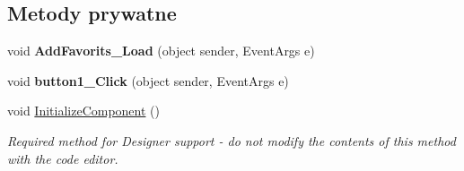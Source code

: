 \subsection*{Metody prywatne}
\begin{DoxyCompactItemize}
\item 
\mbox{\label{class_windows_forms_app2_1_1_ulubione_a14da54462628e6ed6e83b751d2c29eea}} 
void {\bfseries Add\+Favorits\+\_\+\+Load} (object sender, Event\+Args e)
\item 
\mbox{\label{class_windows_forms_app2_1_1_ulubione_a5a6ff5b746877a57b0dd0915068e8932}} 
void {\bfseries button1\+\_\+\+Click} (object sender, Event\+Args e)
\item 
void \hyperlink{class_windows_forms_app2_1_1_ulubione_a3f4798b6ad5b38e969020d292d104e55}{Initialize\+Component} ()
\begin{DoxyCompactList}\small\item\em Required method for Designer support -\/ do not modify the contents of this method with the code editor. \end{DoxyCompactList}\end{DoxyCompactItemize}
